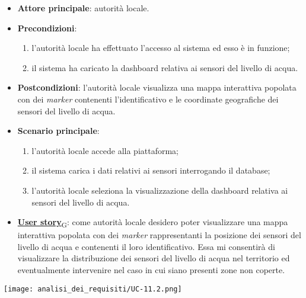 \begin{itemize}
	\item \textbf{Attore principale}: autorità locale.
	\item \textbf{Precondizioni}:
	      \begin{enumerate}
		      \item l'autorità locale ha effettuato l'accesso al sistema ed esso è in funzione;
		      \item il sistema ha caricato la dashboard relativa ai sensori del livello di acqua.
	      \end{enumerate}
	\item \textbf{Postcondizioni}: l'autorità locale visualizza una mappa interattiva popolata con dei \textit{marker} contenenti l'identificativo e le coordinate geografiche dei sensori del livello di acqua.
	\item \textbf{Scenario principale}:
	      \begin{enumerate}
		      \item l'autorità locale accede alla piattaforma;
		      \item il sistema carica i dati relativi ai sensori interrogando il database;
		      \item l'autorità locale seleziona la visualizzazione della dashboard relativa ai sensori del livello di acqua.
	      \end{enumerate}
	\item \href{https://7last.github.io/docs/rtb/documentazione-interna/glossario\#user-story}{\textbf{User story}\textsubscript{G}}:
	      come autorità locale desidero poter visualizzare una mappa interattiva popolata con dei \textit{marker} rappresentanti la posizione dei sensori del livello di acqua
	      e contenenti il loro identificativo. Essa mi consentirà di visualizzare la distribuzione dei sensori del livello di acqua nel territorio ed eventualmente intervenire nel caso in cui siano presenti zone non coperte.
\end{itemize}
\begin{center}
	\texttt{[image: analisi\_dei\_requisiti/UC-11.2.png]}
\end{center}

